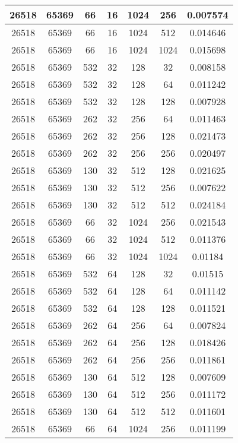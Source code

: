 \documentclass[9pt]{article}
\begin{document}
\begin{tabular}{|c|c|c|c|c|c|c| }
\hline
26518  & 65369  & 66  & 16  & 1024  & 256  & 0.007574 \\
\hline
26518  & 65369  & 66  & 16  & 1024  & 512  & 0.014646 \\
\hline
26518  & 65369  & 66  & 16  & 1024  & 1024  & 0.015698 \\
\hline
26518  & 65369  & 532  & 32  & 128  & 32  & 0.008158 \\
\hline
26518  & 65369  & 532  & 32  & 128  & 64  & 0.011242 \\
\hline
26518  & 65369  & 532  & 32  & 128  & 128  & 0.007928 \\
\hline
26518  & 65369  & 262  & 32  & 256  & 64  & 0.011463 \\
\hline
26518  & 65369  & 262  & 32  & 256  & 128  & 0.021473 \\
\hline
26518  & 65369  & 262  & 32  & 256  & 256  & 0.020497 \\
\hline
26518  & 65369  & 130  & 32  & 512  & 128  & 0.021625 \\
\hline
26518  & 65369  & 130  & 32  & 512  & 256  & 0.007622 \\
\hline
26518  & 65369  & 130  & 32  & 512  & 512  & 0.024184 \\
\hline
26518  & 65369  & 66  & 32  & 1024  & 256  & 0.021543 \\
\hline
26518  & 65369  & 66  & 32  & 1024  & 512  & 0.011376 \\
\hline
26518  & 65369  & 66  & 32  & 1024  & 1024  & 0.01184 \\
\hline
26518  & 65369  & 532  & 64  & 128  & 32  & 0.01515 \\
\hline
26518  & 65369  & 532  & 64  & 128  & 64  & 0.011142 \\
\hline
26518  & 65369  & 532  & 64  & 128  & 128  & 0.011521 \\
\hline
26518  & 65369  & 262  & 64  & 256  & 64  & 0.007824 \\
\hline
26518  & 65369  & 262  & 64  & 256  & 128  & 0.018426 \\
\hline
26518  & 65369  & 262  & 64  & 256  & 256  & 0.011861 \\
\hline
26518  & 65369  & 130  & 64  & 512  & 128  & 0.007609 \\
\hline
26518  & 65369  & 130  & 64  & 512  & 256  & 0.011172 \\
\hline
26518  & 65369  & 130  & 64  & 512  & 512  & 0.011601 \\
\hline
26518  & 65369  & 66  & 64  & 1024  & 256  & 0.011199 \\
\hline

\end{tabular}
\end{document}

